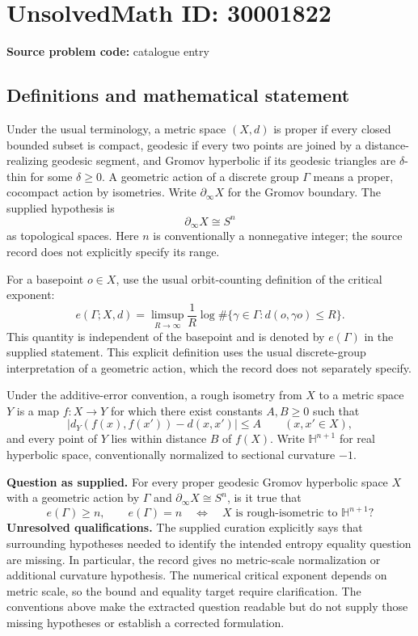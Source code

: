 \documentclass[11pt]{article}
\begin{document}
\section*{UnsolvedMath ID: 30001822}
\textbf{Source problem code:} catalogue entry
\subsection{Definitions and mathematical statement}
Under the usual terminology, a metric space \((X,d)\) is proper if every closed bounded subset is compact, geodesic if every two points are joined by a distance-realizing geodesic segment, and Gromov hyperbolic if its geodesic triangles are \(\delta\)-thin for some \(\delta\geq 0\). A geometric action of a discrete group \(\Gamma\) means a proper, cocompact action by isometries. Write \(\partial_\infty X\) for the Gromov boundary. The supplied hypothesis is
\[
\partial_\infty X\cong S^n
\]
as topological spaces. Here \(n\) is conventionally a nonnegative integer; the source record does not explicitly specify its range.

For a basepoint \(o\in X\), use the usual orbit-counting definition of the critical exponent:
\[
e(\Gamma;X,d)=\limsup_{R\to\infty}\frac{1}{R}\log\#\{\gamma\in\Gamma:d(o,\gamma o)\leq R\}.
\]
This quantity is independent of the basepoint and is denoted by \(e(\Gamma)\) in the supplied statement. This explicit definition uses the usual discrete-group interpretation of a geometric action, which the record does not separately specify.

Under the additive-error convention, a rough isometry from \(X\) to a metric space \(Y\) is a map \(f:X\to Y\) for which there exist constants \(A,B\geq0\) such that
\[
\bigl|d_Y(f(x),f(x'))-d(x,x')\bigr|\leq A\qquad(x,x'\in X),
\]
and every point of \(Y\) lies within distance \(B\) of \(f(X)\). Write \(\mathbb H^{n+1}\) for real hyperbolic space, conventionally normalized to sectional curvature \(-1\).

\textbf{Question as supplied.} For every proper geodesic Gromov hyperbolic space \(X\) with a geometric action by \(\Gamma\) and \(\partial_\infty X\cong S^n\), is it true that
\[
e(\Gamma)\geq n,
\qquad
 e(\Gamma)=n\quad\Longleftrightarrow\quad X\text{ is rough-isometric to }\mathbb H^{n+1}?
\]
\textbf{Unresolved qualifications.} The supplied curation explicitly says that surrounding hypotheses needed to identify the intended entropy equality question are missing. In particular, the record gives no metric-scale normalization or additional curvature hypothesis. The numerical critical exponent depends on metric scale, so the bound and equality target require clarification. The conventions above make the extracted question readable but do not supply those missing hypotheses or establish a corrected formulation.
\end{document}
